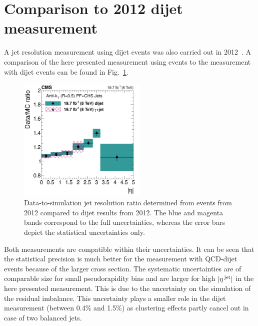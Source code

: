 \section{Comparison to 2012 dijet measurement}
\label{res:sec:comparison_2012}
A jet \pt resolution measurement using dijet events was also carried out in 2012~\cite{bib:Kristin_Thesis}.
A comparison of the here presented measurement using \GAMJET events to the measurement with dijet events can be found in Fig.~\ref{res:fig:Comparison_2012}.
\begin{figure}[!t]
 \centering
    \includegraphics[width=0.55\textwidth]{figures/resolution/results/JER_2012_compPhoton_final_v2.pdf}
  \caption{Data-to-simulation jet \pt resolution ratio determined from \GAMJET events from 2012 compared to dijet results from 2012.
           The blue and magenta bands correspond to the full uncertainties, whereas the error bars depict the statistical uncertainties only.}
  \label{res:fig:Comparison_2012}
\end{figure}
Both measurements are compatible within their uncertainties.
It can be seen that the statistical precision is much better for the measurement with QCD-dijet events because of the larger cross section.
The systematic uncertainties are of comparable size for small pseudorapidity bins and are larger for high $|{\eta}^{\text{\,jet}}|$ in the here presented measurement.
This is due to the uncertainty on the simulation of the residual imbalance.
This uncertainty plays a smaller role in the dijet measurement (between 0.4\% and 1.5\%) as clustering effects partly cancel out in case of two balanced jets.
\FloatBarrier
